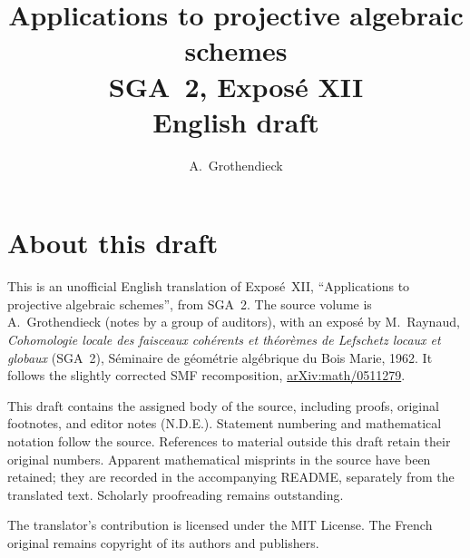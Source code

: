 \documentclass[11pt,a4paper,oneside]{amsbook}
\title[SGA~2, Exposé XII (English draft)]{Applications to projective algebraic schemes\\
{\normalsize SGA~2, Exposé XII\\English draft}}
\author{A.\ Grothendieck}
\date{}
\begin{document}
\frontmatter
\maketitle

\chapter*{About this draft}
This is an unofficial English translation of Expos\'e~XII, ``Applications to projective algebraic schemes'',
from SGA~2. The source volume is A.\ Grothendieck
(notes by a group of auditors), with an expos\'e by M.\ Raynaud,
\textit{Cohomologie locale des faisceaux coh\'erents et th\'eor\`emes
de Lefschetz locaux et globaux} (SGA~2), S\'eminaire de g\'eom\'etrie
alg\'ebrique du Bois Marie, 1962. It follows the slightly corrected
SMF recomposition,
\href{https://arxiv.org/abs/math/0511279}{arXiv:math/0511279}.

This draft contains the assigned body of the source, including proofs,
original footnotes, and editor notes (N.D.E.). Statement numbering and
mathematical notation follow the source. References to material outside
this draft retain their original numbers. Apparent mathematical
misprints in the source have been retained; they are recorded in the
accompanying README, separately from the translated text. Scholarly
proofreading remains outstanding.

The translator's contribution is licensed under
the MIT License.
The French original remains copyright of its authors and publishers.

\tableofcontents
\mainmatter
\setcounter{chapter}{11}




\end{document}
